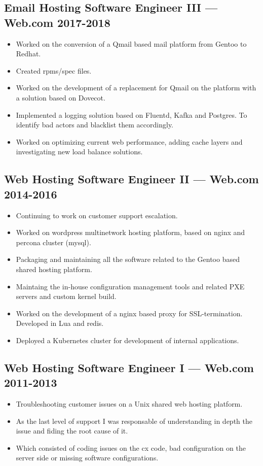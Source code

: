 \documentclass[11pt]{article}
\begin{document}
\subsection{Email Hosting Software Engineer III --- Web.com \hfill 2017-2018}
\begin{itemize}
  \setlength{\parskip}{0pt}
  \setlength{\itemsep}{0pt plus 1pt}
\item Worked on the conversion of a Qmail based mail platform from Gentoo to Redhat.
\item Created rpms/spec files.
\item Worked on the development of a replacement for Qmail on the platform with a solution based on Dovecot.
\item Implemented a logging solution based on Fluentd, Kafka and Postgres. To identify bad actors and blacklist them accordingly.
\item Worked on optimizing current web performance, adding cache layers and investigating new load balance solutions.
\end{itemize}

\subsection{Web Hosting Software Engineer II --- Web.com \hfill 2014-2016}
\begin{itemize}
  \setlength{\parskip}{0pt}
  \setlength{\itemsep}{0pt plus 1pt}
\item Continuing to work on customer support escalation.
\item Worked on wordpress multinetwork hosting platform, based on nginx and percona cluster (mysql).
\item Packaging and maintaining all the software related to the Gentoo based shared hosting platform.
\item Maintaing the in-house configuration management tools and related PXE servers and custom kernel build.
\item Worked on the development of a nginx based proxy for SSL-termination. Developed in Lua and redis.
\item Deployed a Kubernetes cluster for development of internal applications.
\end{itemize}

\subsection{Web Hosting Software Engineer I --- Web.com \hfill 2011-2013}
\begin{itemize}
  \setlength{\parskip}{0pt}
  \setlength{\itemsep}{0pt plus 1pt}
\item Troubleshooting customer issues on a Unix shared web hosting platform.
\item As the last level of support I was responsable of understanding in depth the issue and fiding the root cause of it.
\item Which consisted of coding issues on the cx code, bad configuration on the server side or missing software configurations.
\end{itemize}
\end{document}
